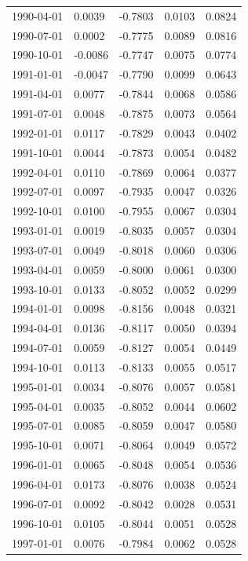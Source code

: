 \begin{longtable}{p{}|p{}p{}p{}p{}}
        1990-04-01	&0.0039	&-0.7803	&0.0103	&0.0824\\
        1990-07-01	&0.0002	&-0.7775	&0.0089	&0.0816\\
        1990-10-01	&-0.0086	&-0.7747	&0.0075	&0.0774\\
        1991-01-01	&-0.0047	&-0.7790	&0.0099	&0.0643\\
        1991-04-01	&0.0077	&-0.7844	&0.0068	&0.0586\\
        1991-07-01	&0.0048	&-0.7875	&0.0073	&0.0564\\
        1992-01-01	&0.0117	&-0.7829	&0.0043	&0.0402\\
        1991-10-01	&0.0044	&-0.7873	&0.0054	&0.0482\\
        1992-04-01	&0.0110	&-0.7869	&0.0064	&0.0377\\
        1992-07-01	&0.0097	&-0.7935	&0.0047	&0.0326\\
        1992-10-01	&0.0100	&-0.7955	&0.0067	&0.0304\\
        1993-01-01	&0.0019	&-0.8035	&0.0057	&0.0304\\
        1993-07-01	&0.0049	&-0.8018	&0.0060	&0.0306\\
        1993-04-01	&0.0059	&-0.8000	&0.0061	&0.0300\\
        1993-10-01	&0.0133	&-0.8052	&0.0052	&0.0299\\
        1994-01-01	&0.0098	&-0.8156	&0.0048	&0.0321\\
        1994-04-01	&0.0136	&-0.8117	&0.0050	&0.0394\\
        1994-07-01	&0.0059	&-0.8127	&0.0054	&0.0449\\
        1994-10-01	&0.0113	&-0.8133	&0.0055	&0.0517\\
        1995-01-01	&0.0034	&-0.8076	&0.0057	&0.0581\\
        1995-04-01	&0.0035	&-0.8052	&0.0044	&0.0602\\
        1995-07-01	&0.0085	&-0.8059	&0.0047	&0.0580\\
        1995-10-01	&0.0071	&-0.8064	&0.0049	&0.0572\\
        1996-01-01	&0.0065	&-0.8048	&0.0054	&0.0536\\
        1996-04-01	&0.0173	&-0.8076	&0.0038	&0.0524\\
        1996-07-01	&0.0092	&-0.8042	&0.0028	&0.0531\\
        1996-10-01	&0.0105	&-0.8044	&0.0051	&0.0528\\
        1997-01-01	&0.0076	&-0.7984	&0.0062	&0.0528\\

\end{longtable}

